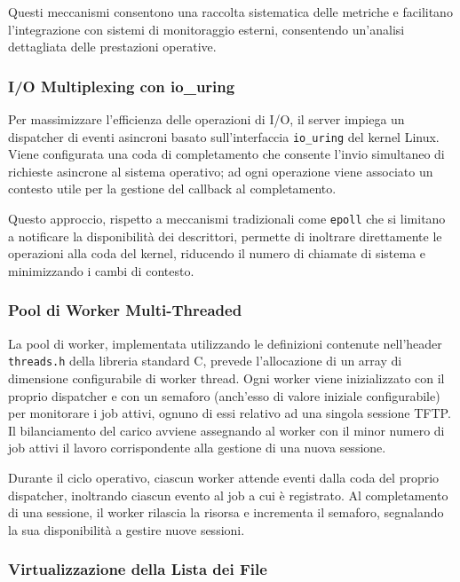 \documentclass[12pt]{article}
\begin{document}
{Questi meccanismi consentono una raccolta sistematica delle metriche e facilitano l'integrazione con sistemi di monitoraggio esterni, consentendo un'analisi dettagliata delle prestazioni operative.

\pagebreak
\subsubsection{I/O Multiplexing con io\_uring}

Per massimizzare l'efficienza delle operazioni di I/O, il server impiega un dispatcher di eventi asincroni basato sull'interfaccia \texttt{io\_uring} del kernel Linux. Viene configurata una coda di completamento che consente l'invio simultaneo di richieste asincrone al sistema operativo; ad ogni operazione viene associato un contesto utile per la gestione del callback al completamento.

Questo approccio, rispetto a meccanismi tradizionali come \texttt{epoll} che si limitano a notificare la disponibilità dei descrittori, permette di inoltrare direttamente le operazioni alla coda del kernel, riducendo il numero di chiamate di sistema e minimizzando i cambi di contesto.

\subsubsection{Pool di Worker Multi-Threaded}

La pool di worker, implementata utilizzando le definizioni contenute nell'header \texttt{threads.h} della libreria standard C, prevede l'allocazione di un array di dimensione configurabile di worker thread.
Ogni worker viene inizializzato con il proprio dispatcher e con un semaforo (anch'esso di valore iniziale configurabile) per monitorare i job attivi, ognuno di essi relativo ad una singola sessione TFTP.
Il bilanciamento del carico avviene assegnando al worker con il minor numero di job attivi il lavoro corrispondente alla gestione di una nuova sessione.

Durante il ciclo operativo, ciascun worker attende eventi dalla coda del proprio dispatcher, inoltrando ciascun evento al job a cui è registrato.
Al completamento di una sessione, il worker rilascia la risorsa e incrementa il semaforo, segnalando la sua disponibilità a gestire nuove sessioni.

\subsubsection{Virtualizzazione della Lista dei File}

}
\end{document}
